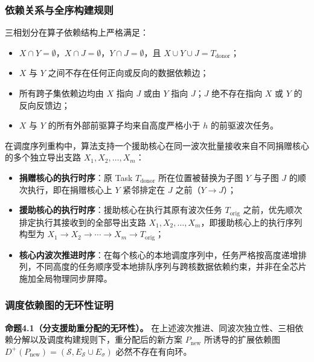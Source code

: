 \documentclass[anonymous,withtoc]{gmcm2026}
\providecommand{\tightlist}{\setlength{\itemsep}{0pt}\setlength{\parskip}{0pt}}
\begin{document}
\subsubsection{依赖关系与全序构建规则}

三相划分在算子依赖结构上严格满足：

\begin{itemize}
\tightlist
\item
  \(X \cap Y = \emptyset\)，\(X \cap J = \emptyset\)，\(Y \cap J = \emptyset\)，且 \(X \cup Y \cup J = T_{\mathrm{donor}}\)；
\item
  \(X\) 与 \(Y\) 之间不存在任何正向或反向的数据依赖边；
\item
  所有跨子集依赖边均由 \(X\) 指向 \(J\) 或由 \(Y\) 指向 \(J\)；\(J\) 绝不存在指向 \(X\) 或 \(Y\) 的反向反馈边；
\item
  \(X\) 与 \(Y\) 的所有外部前驱算子均来自高度严格小于 \(h\) 的前驱波次任务。
\end{itemize}

在调度序列重构中，算法支持一个援助核心在同一波次批量接收来自不同捐赠核心的多个独立导出支路 \(X_1, X_2, \dots, X_m\)：

\begin{itemize}
\tightlist
\item
  \textbf{捐赠核心的执行时序}：原 Task \(T_{\mathrm{donor}}\) 所在位置被替换为子图 \(Y\) 与子图 \(J\) 的顺次执行，即在捐赠核心上 \(Y\) 紧邻排定在 \(J\) 之前（\(Y \to J\)）；
\item
  \textbf{援助核心的执行时序}：援助核心在执行其原有波次任务 \(T_{\mathrm{orig}}\) 之前，优先顺次排定执行其接收到的全部导出支路 \(X_1, X_2, \dots, X_m\)，即援助核心上的执行序列构型为 \(X_1 \to X_2 \to \cdots \to X_m \to T_{\mathrm{orig}}\)；
\item
  \textbf{核心内波次推进时序}：在每个核心的本地调度序列中，任务严格按高度递增排列，不同高度的任务顺序受本地排队序列与跨核数据依赖约束，并非在全芯片施加全局物理同步屏障。
\end{itemize}

\subsubsection{调度依赖图的无环性证明}

\textbf{命题4.1（分支援助重分配的无环性）。} 在上述波次推进、同波次独立性、三相依赖分解以及调度构建规则下，重分配后的新方案 \(P_{\mathrm{new}}\) 所诱导的扩展依赖图 \(D^+(P_{\mathrm{new}}) = (\mathcal{S}, E_{\mathcal{S}} \cup E_\sigma)\) 必然不存在有向环。
\end{document}

